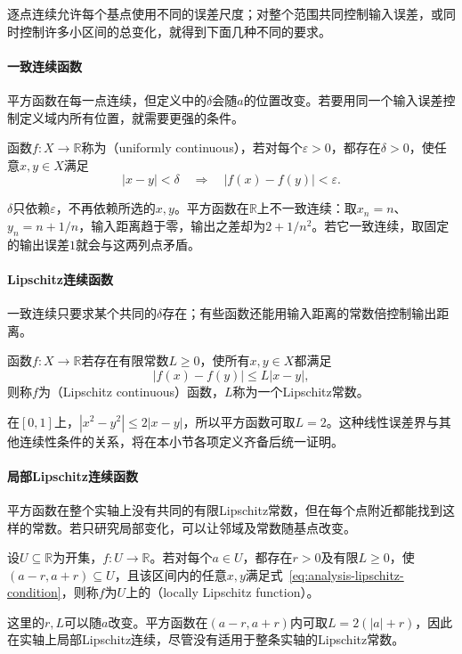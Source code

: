 逐点连续允许每个基点使用不同的误差尺度；对整个范围共同控制输入误差，或同时控制许多小区间的总变化，就得到下面几种不同的要求。

\paragraph{一致连续函数}
平方函数在每一点连续，但定义中的$\delta$会随$a$的位置改变。若要用同一个输入误差控制定义域内所有位置，就需要更强的条件。
\begin{definition}[一致连续函数]
\label{def:analysis-uniform-continuity}
函数$f:X\to\mathbb R$称为（uniformly continuous），若对每个$\varepsilon>0$，都存在$\delta>0$，使任意$x,y\in X$满足
\[
 |x-y|<\delta\quad\Longrightarrow\quad |f(x)-f(y)|<\varepsilon.
\]
\end{definition}
$\delta$只依赖$\varepsilon$，不再依赖所选的$x,y$。平方函数在$\mathbb R$上不一致连续：取$x_n=n$、$y_n=n+1/n$，输入距离趋于零，输出之差却为$2+1/n^2$。若它一致连续，取固定的输出误差$1$就会与这两列点矛盾。

\paragraph{Lipschitz连续函数}
一致连续只要求某个共同的$\delta$存在；有些函数还能用输入距离的常数倍控制输出距离。
\begin{definition}[Lipschitz连续函数]
\label{def:analysis-lipschitz-continuity}
函数$f:X\to\mathbb R$若存在有限常数$L\geq0$，使所有$x,y\in X$都满足
\begin{equation}
 |f(x)-f(y)|\leq L|x-y|,
\label{eq:analysis-lipschitz-condition}
\end{equation}
则称$f$为（Lipschitz continuous）函数，$L$称为一个Lipschitz常数。
\end{definition}
在$[0,1]$上，$|x^2-y^2|\leq2|x-y|$，所以平方函数可取$L=2$。这种线性误差界与其他连续性条件的关系，将在本小节各项定义齐备后统一证明。

\paragraph{局部Lipschitz连续函数}
平方函数在整个实轴上没有共同的有限Lipschitz常数，但在每个点附近都能找到这样的常数。若只研究局部变化，可以让邻域及常数随基点改变。

\begin{definition}[局部Lipschitz连续函数]
\label{def:analysis-local-lipschitz}
设$U\subseteq\mathbb R$为开集，$f:U\to\mathbb R$。若对每个$a\in U$，都存在$r>0$及有限$L\geq0$，使$(a-r,a+r)\subseteq U$，且该区间内的任意$x,y$满足式~\eqref{eq:analysis-lipschitz-condition}，则称$f$为$U$上的（locally Lipschitz function）。
\end{definition}
这里的$r,L$可以随$a$改变。平方函数在$(a-r,a+r)$内可取$L=2(|a|+r)$，因此在实轴上局部Lipschitz连续，尽管没有适用于整条实轴的Lipschitz常数。

